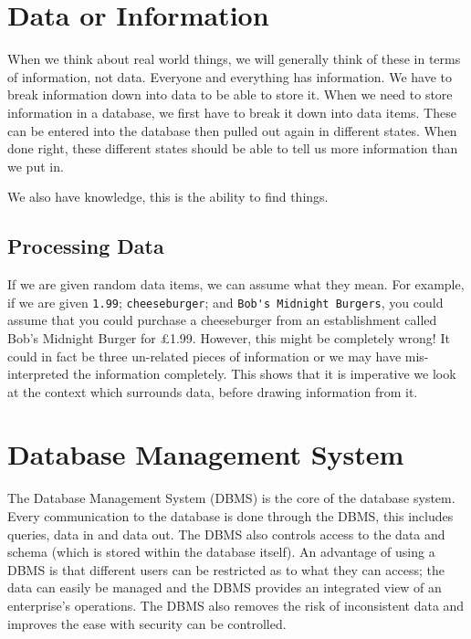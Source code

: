 
\section*{Data or Information}
When we think about real world things, we will generally think of these in terms of information, not data. Everyone and everything has information. We have to break information down into data to be able to store it. 
When we need to store information in a database, we first have to break it down into data items. These can be entered into the database then pulled out again in different states. When done right, these different states should be able to tell us more information than we put in. 

We also have knowledge, this is the ability to find things.
\subsection*{Processing Data}
If we are given random data items, we can assume what they mean. For example, if we are given \verb|1.99|; \verb|cheeseburger|; and \verb|Bob's Midnight Burgers|, you could assume that you could purchase a cheeseburger from an establishment called Bob's Midnight Burger for £1.99. However, this might be completely wrong! It could in fact be three un-related pieces of information or we may have mis-interpreted the information completely. This shows that it is imperative we look at the context which surrounds data, before drawing information from it. 

\section*{Database Management System}
The Database Management System (DBMS) is the core of the database system. Every communication to the database is done through the DBMS, this includes queries, data in and data out. The DBMS also controls access to the data and schema (which is stored within the database itself).
An advantage of using a DBMS is that different users can be restricted as to what they can access; the data can easily be managed and the DBMS provides an integrated view of an enterprise's operations. The DBMS also removes the risk of inconsistent data and improves the ease with security can be controlled.

